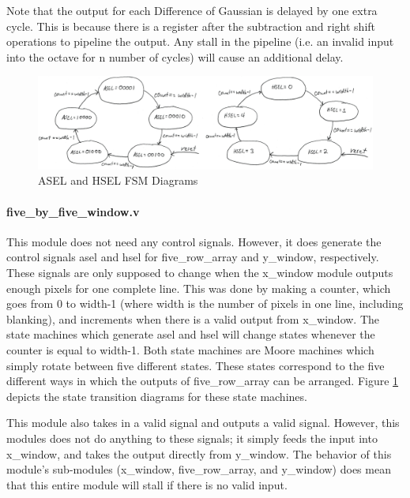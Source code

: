 Note that the output for each Difference of Gaussian is delayed by one extra cycle. This is because there is a register after the subtraction and right shift operations to pipeline the output. Any stall in the pipeline (i.e. an invalid input into the octave for n number of cycles) will cause an additional delay.

\begin{figure}{\textwidth}
    \includegraphics[width=\textwidth]{processed_image_pngs/sel_states2.png}
    \caption{ASEL and HSEL FSM Diagrams}
    \label{fig:sel_states}
\end{figure}


\paragraph{five\_by\_five\_window.v}
This module does not need any control signals. However, it does generate the 
control signals asel and hsel for five\_row\_array and y\_window, respectively. 
These signals are only supposed to change when the x\_window module outputs 
enough pixels for one complete line. This was done by making a counter, which 
goes from 0 to width-1 (where width is the number of pixels in one line, 
including blanking), and increments when there is a valid output from x\_window. 
The state machines which generate asel and hsel will change states whenever the 
counter is equal to width-1. Both state machines are Moore machines which simply 
rotate between five different states. These states correspond to the five 
different ways in which the outputs of five\_row\_array can be arranged. Figure 
\ref{fig:sel_states} depicts the state transition diagrams for these state machines.



This module also takes in a valid signal and outputs a valid signal. However, 
this modules does not do anything to these signals; it simply feeds the input 
into x\_window, and takes the output directly from y\_window. The behavior of this 
module's sub-modules (x\_window, five\_row\_array, and y\_window) does mean that 
this entire module will stall if there is no valid input.

